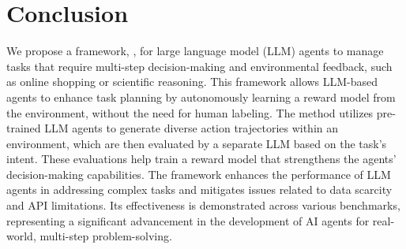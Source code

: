 \section{Conclusion}
We propose a framework, \Model, for large language model (LLM) agents to manage tasks that require multi-step decision-making and environmental feedback, such as online shopping or scientific reasoning. This framework allows LLM-based agents to enhance task planning by autonomously learning a reward model from the environment, without the need for human labeling. The method utilizes pre-trained LLM agents to generate diverse action trajectories within an environment, which are then evaluated by a separate LLM based on the task's intent. These evaluations help train a reward model that strengthens the agents' decision-making capabilities. The framework enhances the performance of LLM agents in addressing complex tasks and mitigates issues related to data scarcity and API limitations. Its effectiveness is demonstrated across various benchmarks, representing a significant advancement in the development of AI agents for real-world, multi-step problem-solving.